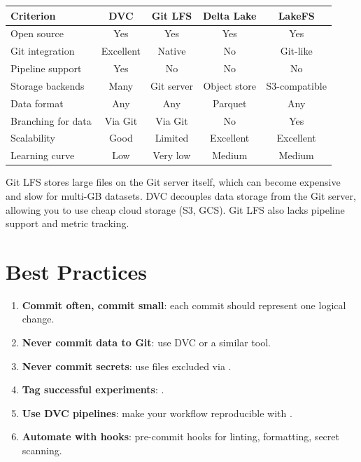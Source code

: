\begin{center}
\begin{tabular}{@{}lcccc@{}}
\toprule
\textbf{Criterion} & \textbf{DVC} & \textbf{Git LFS} & \textbf{Delta Lake} & \textbf{LakeFS} \\
\midrule
Open source        & Yes  & Yes  & Yes  & Yes  \\
Git integration    & Excellent & Native & No & Git-like \\
Pipeline support   & Yes  & No   & No   & No   \\
Storage backends   & Many & Git server & Object store & S3-compatible \\
Data format        & Any  & Any  & Parquet & Any  \\
Branching for data & Via Git & Via Git & No & Yes \\
Scalability        & Good & Limited & Excellent & Excellent \\
Learning curve     & Low  & Very low & Medium & Medium \\
\bottomrule
\end{tabular}
\end{center}

\begin{warning}[title=\textbf{Git LFS limitations}]
Git LFS stores large files on the Git server itself, which can become
expensive and slow for multi-GB datasets. DVC decouples data storage from
the Git server, allowing you to use cheap cloud storage (S3, GCS).
Git LFS also lacks pipeline support and metric tracking.
\end{warning}

\section{Best Practices}

\begin{bestpractice}[title=\textbf{Version control golden rules}]
\begin{enumerate}
  \item \textbf{Commit often, commit small}: each commit should represent
    one logical change.
  \item \textbf{Never commit data to Git}: use DVC or a similar tool.
  \item \textbf{Never commit secrets}: use  files excluded via
    .
  \item \textbf{Tag successful experiments}: .
  \item \textbf{Use DVC pipelines}: make your workflow reproducible with
    .
  \item \textbf{Automate with hooks}: pre-commit hooks for linting,
    formatting, secret scanning.
\end{enumerate}
\end{bestpractice}

